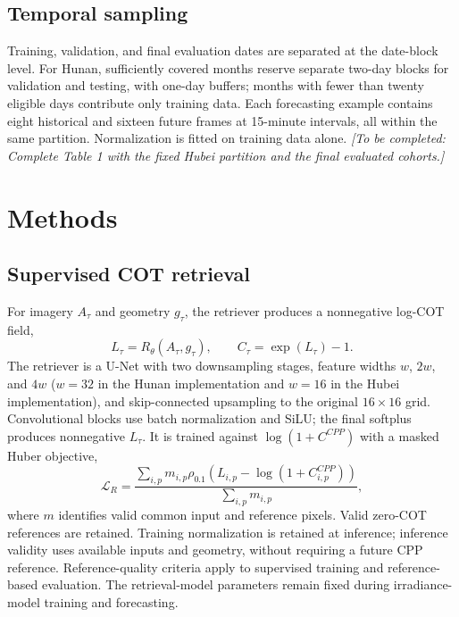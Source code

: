 \documentclass[11pt]{article}
\newcommand{\pending}[1]{\textit{[To be completed: #1]}}
\begin{document}
\subsection{Temporal sampling}
Training, validation, and final evaluation dates are separated at the date-block level. For Hunan, sufficiently covered months reserve separate two-day blocks for validation and testing, with one-day buffers; months with fewer than twenty eligible days contribute only training data. Each forecasting example contains eight historical and sixteen future frames at 15-minute intervals, all within the same partition. Normalization is fitted on training data alone. \pending{Complete Table 1 with the fixed Hubei partition and the final evaluated cohorts.}

\section{Methods}
\subsection{Supervised COT retrieval}
For imagery $A_\tau$ and geometry $g_\tau$, the retriever produces a nonnegative log-COT field,
\begin{equation}
L_\tau=R_\theta(A_\tau,g_\tau),\qquad C_\tau=\exp(L_\tau)-1.
\label{eq:retrieval}
\end{equation}
The retriever is a U-Net with two downsampling stages, feature widths $w$, $2w$, and $4w$ ($w=32$ in the Hunan implementation and $w=16$ in the Hubei implementation), and skip-connected upsampling to the original $16\times16$ grid. Convolutional blocks use batch normalization and SiLU; the final softplus produces nonnegative $L_\tau$. It is trained against $\log(1+C^{CPP})$ with a masked Huber objective,
\begin{equation}
\mathcal L_R=\frac{\sum_{i,p}m_{i,p}\rho_{0.1}\!\left(L_{i,p}-\log(1+C^{CPP}_{i,p})\right)}{\sum_{i,p}m_{i,p}},
\label{eq:retrieval-loss}
\end{equation}
where $m$ identifies valid common input and reference pixels. Valid zero-COT references are retained. Training normalization is retained at inference; inference validity uses available inputs and geometry, without requiring a future CPP reference. Reference-quality criteria apply to supervised training and reference-based evaluation. The retrieval-model parameters remain fixed during irradiance-model training and forecasting.
\end{document}
